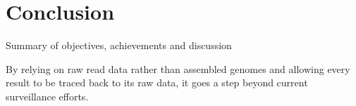 \chapter{Conclusion}\label{chap:conclusion}
\todoit
Summary of objectives, achievements and discussion

By relying on raw read data rather than assembled genomes and allowing every result to be traced back to its raw data, it goes a step beyond current surveillance efforts.